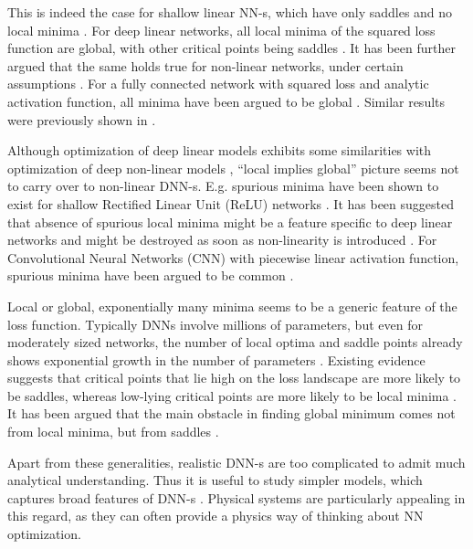 \documentclass[12pt,a4paper]{JHEP3}
\begin{document}
This is indeed the case for shallow linear NN-s, which have only saddles and no local minima \cite{BALDI198953}. For  deep linear networks, all local minima of the  squared loss function are global, with other critical points being saddles \cite{kawaguchi2016deep}. It has been further argued  that the same holds true for non-linear networks, under certain assumptions \cite{kawaguchi2016deep}. 
For a fully connected network with squared loss and analytic activation function, all minima have been argued to be global \cite{nguyen2017loss}.  Similar results were previously shown in \cite{107014, fra, 410380}.

Although optimization of deep linear models exhibits some similarities with optimization of deep non-linear  models \cite{saxe2014exact},  ``local implies global'' picture seems not to carry over to non-linear DNN-s.
E.g. spurious minima have been shown to exist for shallow Rectified Linear Unit (ReLU) networks \cite{safran2018spurious}. It  has been suggested that absence of spurious local minima might be a feature specific to deep linear networks and might be destroyed as soon as non-linearity is introduced  \cite{yun2019small, zou2018stochastic, swirszcz2017local}.  For Convolutional Neural Networks (CNN) with  piecewise linear activation function, spurious minima have been argued to be common \cite{liu2021spurious}.


Local or global, exponentially many minima seems to be a generic feature of the loss function. 
Typically DNNs involve millions of parameters, but even for moderately sized networks, the number of local optima and saddle points already shows exponential growth in the number of parameters \cite{NIPS1995_3806734b, NIPS1996_a51fb975, choromanska2015loss, pmlr-v38-choromanska15}.
Existing evidence suggests that critical points that lie high on the loss landscape are more likely to be saddles, whereas low-lying critical points are more likely to be local minima \cite{Ramu-2005, Bray_2007, fyodorov2007replica}. It has been argued that the main obstacle in finding global minimum comes not from local minima, but from saddles \cite{dauphin2014identifying, pascanu2014saddle}.

Apart from these generalities, realistic DNN-s are too complicated to admit much analytical understanding.
Thus it is useful to study simpler models, which captures broad features  of DNN-s \cite{Goodfellow-et-al-2016}. 
Physical systems are particularly appealing in this regard, as they can often provide a physics way of thinking about NN optimization.
\end{document}
